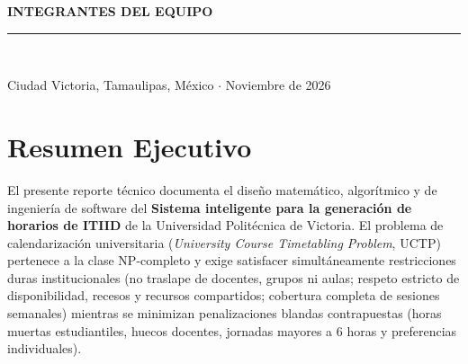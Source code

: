 \documentclass[11pt,letterpaper]{article}
\newcommand{\seccionUPV}[1]{%
    \section{\texorpdfstring{\textcolor{upvmorado}{#1}}{#1}}%
    \vspace{-0.22cm}{\color{upvnaranja}\rule{\textwidth}{1.1pt}}\vspace{0.12cm}%
}
\begin{document}
\begin{titlepage}
    \vspace{0.45cm}
    {\normalsize\bfseries\color{upvmorado} INTEGRANTES DEL EQUIPO\par}
    \vspace{0.18cm}


    \vfill
    {\color{upvmorado}\rule{0.55\textwidth}{0.6pt}}\\[0.15cm]
    {\small\color{gristexto} Ciudad Victoria, Tamaulipas, México $\cdot$ Noviembre de 2026\par}
\end{titlepage}

\tableofcontents
\newpage
{}

\seccionUPV{Resumen Ejecutivo}

El presente reporte técnico documenta el diseño matemático, algorítmico y de ingeniería de software del \textbf{Sistema inteligente para la generación de horarios de ITIID} de la Universidad Politécnica de Victoria. El problema de calendarización universitaria (\textit{University Course Timetabling Problem}, UCTP) pertenece a la clase NP-completo y exige satisfacer simultáneamente restricciones duras institucionales (no traslape de docentes, grupos ni aulas; respeto estricto de disponibilidad, recesos y recursos compartidos; cobertura completa de sesiones semanales) mientras se minimizan penalizaciones blandas contrapuestas (horas muertas estudiantiles, huecos docentes, jornadas mayores a 6 horas y preferencias individuales).
\end{document}
